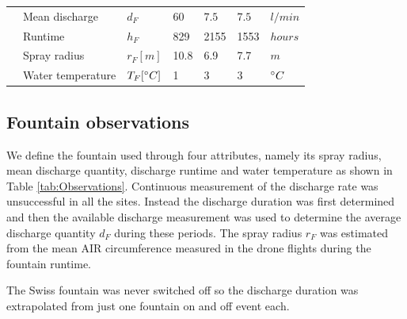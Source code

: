 \documentclass[utf8]{frontiersSCNS} %
\begin{document}
\begin{table}
\begin{tabular}{@{}|lllllll|@{}}
		\multicolumn{1}{|l|}{\multirow{4}{*}{\rotatebox[origin=c]{90}{Fountain}}}
		                       & Mean discharge              & $d_F     $          & $60$          & $7.5$        &
		$7.5$                  & $l/min$                                                                                                      \\
		\multicolumn{1}{|l|}{} & Runtime                     & $h_F $              & 829           & 2155
		                       & 1553                        & $hours$                                                                        \\
		\multicolumn{1}{|l|}{} & Spray radius                & $r_{F} [m]$         & 10.8          & 6.9
		                       & 7.7                         & $m$                                                                            \\
		\multicolumn{1}{|l|}{} & Water temperature           & $T_{F} [\degree C]$ & 1             & 3
		                       & 3                           & $\degree C$                                                                    \\\midrule
	\end{tabular}
\end{table}


\subsection{Fountain observations}

We define the fountain used through four attributes, namely its spray radius, mean discharge quantity, discharge
runtime and water temperature as shown in Table \ref{tab:Observations}. Continuous measurement of the discharge
rate was unsuccessful in all the sites. Instead the discharge duration was first determined and then the available
discharge measurement was used to determine the average discharge quantity $d_F$ during these periods. The spray radius $r_F$ was estimated from the mean AIR circumference measured in the drone flights
during the fountain runtime.

The Swiss fountain was never switched off so the discharge duration was extrapolated from just one fountain on and
off event each.
\end{document}
